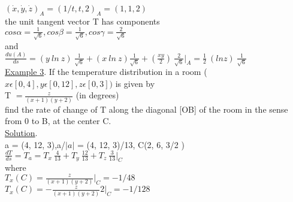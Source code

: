 \documentclass[11pt]{amsbook}
\begin{document}
\hspace*{10ex} $(\dot{x},\dot{y},\dot{z})_A = (1/t, t, 2)_A = (1,1,2) $\\
the unit tangent vector T has components\\
\hspace*{14ex}  $cos \alpha =\frac{1}{\sqrt{6}} , cos \beta = \frac{1}{\sqrt{6}} , cos \gamma = \frac{2}{\sqrt{6}}$\\
and\\
\hspace*{5ex}$\frac{du(A)}{ds} = (y \ ln \ z) \ \frac{1}{\sqrt{6}} + (x \ ln \ z) \frac{1}{\sqrt{6}} +  (\frac{xy}{2})  \ \frac{2}{\sqrt{6}}\rvert_A = \frac{1}{2} \ (ln z) \ \frac{1}{\sqrt{6}} $\\
\hspace*{6ex}\underline{Example 3}. If the temperature distribution  in a room ($ x\epsilon[0, 4], y\epsilon[0, 12], z\epsilon[0, 3])$  is given by\\
\hspace*{15ex} T $= \frac{z}{(x+1)(y+2)}$ \qquad  (in degrees)\\
find the rate of change of T along the diagonal [OB] of the room in the sense from 0  to  B, at the center  C.\\
\hspace*{6ex}\underline{Solution}.\\
\hspace*{6ex}a = (4, 12, 3),\quad a/$|a|$ = (4, 12, 3)/13,     \quad  C(2, 6, 3/2 )\\
\hspace*{15ex} $\frac{dT}{ds}  =  T_a = T_x \  \frac{4}{13} + T_y \ \frac{12}{13} + T_z \ \frac{3}{13}\rvert_C   $ \\
where\\
\hspace*{15ex} $T_x(C)   =   \frac{z}{(x+1)(y+2)}\rvert_C  = - 1/48 $ 
\vspace*{3ex}\\
\hspace*{15ex} $T_x(C)   =  - \frac{z}{(x+1)(y+2)}2\rvert_C  = - 1/128 $ \\
     
       
\end{document}
